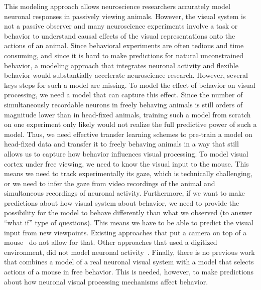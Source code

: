 \documentclass[B2,COG]{ercgrant}
\begin{document}
This modeling approach allows neuroscience researchers accurately model neuronal responses in passively viewing animals. 
However, the visual system is not a passive observer and many neuroscience experiments involve a task or behavior to understand causal effects of the visual representations onto the actions of an animal. 
Since behavioral experiments are often tedious and time consuming, and since it is hard to make predictions for natural unconstrained behavior, a modeling approach that integrates neuronal activity and flexible behavior would substantially accelerate neuroscience research. 
However, several keys steps for such a model are missing. 
To model the effect of behavior on visual processing, we need a model that can capture this effect. 
Since the number of simultaneously recordable neurons in freely behaving animals is still orders of magnitude lower than in head-fixed animals, training such a model from scratch on one experiment only likely would not realize the full predictive power of such a model. 
Thus, we need effective transfer learning schemes to pre-train a model on head-fixed data and transfer it to freely behaving animals in a way that still allows us to capture how behavior influences visual processing. 
To model visual cortex under free viewing, we need to know the visual input to the mouse. 
This means we need to track experimentally its gaze, which is technically challenging, or we need to infer the gaze from video recordings of the animal and simultaneous recordings of neuronal activity. 
Furthermore, if we want to make predictions about how visual system about behavior, we need to provide the possibility for the model to behave differently than what we observed (to answer ``what if'' type of questions). 
This means we have to be able to predict the visual input from new viewpoints.
Existing approaches that put a camera on top of a mouse~\parencite{Parker2022-ac} do not allow for that. 
Other approaches that used a digitized environment, did not model neuronal activity~\parencite{Holmgren2021-jv}.
Finally, there is no previous work that combines a model of a real neuronal visual system with a model that selects actions of a mouse in free behavior. 
This is needed, however, to make predictions about how neuronal visual processing mechanisms affect behavior. 

\end{document}

